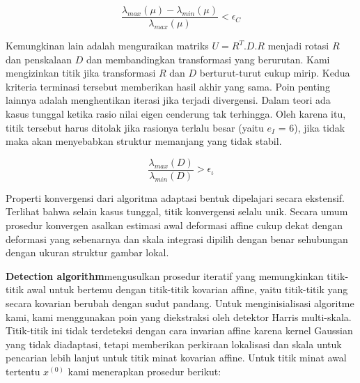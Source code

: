 \begin{equation}
  \frac{\lambda_{max}(\mu)-\lambda_{min}(\mu)}{\lambda_{max}(\mu)} < \epsilon_{C}
\end{equation}

Kemungkinan lain adalah menguraikan matriks \(U = R^{T}.D.R\) menjadi rotasi \(R\) dan penskalaan \(D\) dan membandingkan 
transformasi yang berurutan. Kami mengizinkan titik jika transformasi \(R\) dan \(D\) berturut-turut cukup mirip. 
Kedua kriteria terminasi tersebut memberikan hasil akhir yang sama. Poin penting lainnya adalah menghentikan iterasi jika 
terjadi divergensi. Dalam teori ada kasus tunggal ketika rasio nilai eigen cenderung tak terhingga. 
Oleh karena itu, titik tersebut harus ditolak jika rasionya terlalu besar (yaitu \(e_{I}\) = 6), 
jika tidak maka akan menyebabkan struktur memanjang yang tidak stabil.

\begin{equation}
  \frac{\lambda_{max}(D)}{\lambda_{min}(D)} > \epsilon_{\iota}
\end{equation}

Properti konvergensi dari algoritma adaptasi bentuk dipelajari secara ekstensif. Terlihat bahwa selain kasus tunggal, titik konvergensi selalu unik. Secara umum prosedur konvergen asalkan estimasi awal deformasi affine cukup dekat dengan deformasi yang sebenarnya dan skala integrasi dipilih dengan benar sehubungan dengan ukuran struktur gambar lokal.

\textbf{Detection algorithm}mengusulkan prosedur iteratif yang memungkinkan titik-titik awal untuk bertemu dengan titik-titik kovarian affine, yaitu titik-titik yang secara kovarian berubah dengan sudut pandang. Untuk menginisialisasi algoritme kami, kami menggunakan poin yang diekstraksi oleh detektor Harris multi-skala. Titik-titik ini tidak terdeteksi dengan cara invarian affine karena kernel Gaussian yang tidak diadaptasi, tetapi memberikan perkiraan lokalisasi dan skala untuk pencarian lebih lanjut untuk titik minat kovarian affine. 
Untuk titik minat awal tertentu \(x^{(0)}\) kami menerapkan prosedur berikut:

